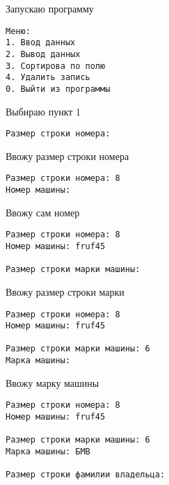 Запускаю программу

\begin{tcolorbox}
\begin{verbatim}
Меню:
1. Ввод данных       
2. Вывод данных      
3. Сортирова по полю 
4. Удалить запись    
0. Выйти из программы
\end{verbatim}
\end{tcolorbox}

Выбираю пункт 1

\begin{tcolorbox}
\begin{verbatim}
Размер строки номера: 
\end{verbatim}
\end{tcolorbox}

Ввожу размер строки номера

\begin{tcolorbox}
\begin{verbatim}
Размер строки номера: 8  
Номер машины: 
\end{verbatim}
\end{tcolorbox}

Ввожу сам номер

\begin{tcolorbox}
\begin{verbatim}
Размер строки номера: 8  
Номер машины: fruf45

Размер строки марки машины: 
\end{verbatim}
\end{tcolorbox}

Ввожу размер строки марки 

\begin{tcolorbox}
\begin{verbatim}
Размер строки номера: 8
Номер машины: fruf45

Размер строки марки машины: 6
Марка машины: 
\end{verbatim}
\end{tcolorbox}

Ввожу марку машины

\begin{tcolorbox}
\begin{verbatim}
Размер строки номера: 8
Номер машины: fruf45

Размер строки марки машины: 6
Марка машины: БМВ

Размер строки фамилии владельца: 
\end{verbatim}
\end{tcolorbox}

